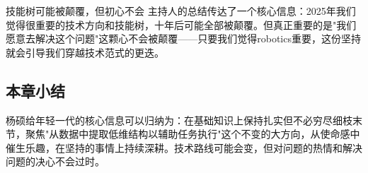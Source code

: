 \begin{warningbox}{技能树可能被颠覆，但初心不会}
主持人的总结传达了一个核心信息：2025年我们觉得很重要的技术方向和技能树，十年后可能全部被颠覆。但真正重要的是"我们愿意去解决这个问题"这颗心不会被颠覆——只要我们觉得robotics重要，这份坚持就会引导我们穿越技术范式的更迭。
\end{warningbox}

\subsection{本章小结}

杨硕给年轻一代的核心信息可以归纳为：在基础知识上保持扎实但不必穷尽细枝末节，聚焦"从数据中提取低维结构以辅助任务执行"这个不变的大方向，从使命感中催生乐趣，在坚持的事情上持续深耕。技术路线可能会变，但对问题的热情和解决问题的决心不会过时。


